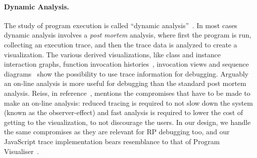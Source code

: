 \paragraph{Dynamic Analysis.} The study of program execution is called
``dynamic analysis''~\cite{cornelissen2009systematic}.  In most cases
dynamic analysis involves a \textit{post mortem} analysis, where first
the program is run, collecting an execution trace, and then the trace
data is analyzed to create a visualization.  The various derived
visualizations, like class and instance interaction graphs, function
invocation histories~\cite{lange1995program}, invocation views and
sequence diagrams~\cite{cornelissen2008execution} show the possibility
to use trace information for debugging.  Arguably an on-line analysis is
more useful for debugging than the standard post mortem analysis. Reiss,
in reference~\cite{reiss2006visualizing}, mentions the compromises that
have to be made to make an on-line analysis:  reduced tracing is
required to not slow down the system (known as the observer-effect) and
fast analysis is required to lower the cost of getting to the
visualization, to not discourage the users.  In our design, we handle
the same compromises as they are relevant for RP debugging too, and our
JavaScript trace implementation bears resemblance to that of Program
Visualiser~\cite{lange1995program}.




